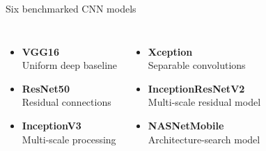 \documentclass[aspectratio=169,11pt]{beamer}
\newcommand{\stepitem}{\item<+->}
\newcommand{\stepitem}{\item}
\begin{document}
\begin{frame}{Six benchmarked CNN models}

\vspace{-0.25em}

\begin{columns}[T,onlytextwidth]


\begin{itemize}
  \setlength{\itemsep}{0.7em}

  \stepitem \textbf{VGG16}\\
        {\small Uniform deep baseline}

  \stepitem \textbf{ResNet50}\\
        {\small Residual connections}

  \stepitem \textbf{InceptionV3}\\
        {\small Multi-scale processing}
\end{itemize}


\begin{itemize}
  \setlength{\itemsep}{0.7em}

  \stepitem \textbf{Xception}\\
        {\small Separable convolutions}

  \stepitem \textbf{InceptionResNetV2}\\
        {\small Multi-scale residual model}

  \stepitem \textbf{NASNetMobile}\\
        {\small Architecture-search model}
\end{itemize}

\end{columns}

\end{frame}

\end{document}
